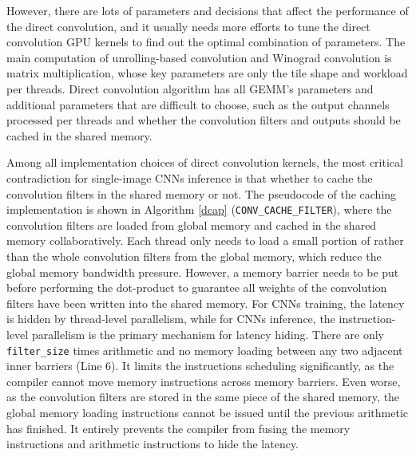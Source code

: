 \documentclass{article}
\begin{document}
However, there are lots of parameters and decisions that affect the performance of the direct convolution, and it usually needs more efforts to tune the direct convolution GPU kernels to find out the optimal combination of parameters. The main computation of unrolling-based convolution and Winograd convolution is matrix multiplication, whose key parameters are only the tile shape and workload per threads. Direct convolution algorithm has all GEMM's parameters and additional parameters that are difficult to choose, such as the output channels processed per threads and whether the convolution filters and outputs should be cached in the shared memory.

Among all implementation choices of direct convolution kernels, the most critical contradiction for single-image CNNs inference is that whether to cache the convolution filters in the shared memory or not. The pseudocode of the caching implementation is shown in Algorithm \ref{dcap} (\texttt{CONV\_CACHE\_FILTER}), where the convolution filters are loaded from global memory and cached in the shared memory collaboratively. Each thread only needs to load a small portion of rather than the whole convolution filters from the global memory, which reduce the global memory bandwidth pressure. However, a memory barrier needs to be put before performing the dot-product to guarantee all weights of the convolution filters have been written into the shared memory. For CNNs training, the latency is hidden by thread-level parallelism, while for CNNs inference, the instruction-level parallelism is the primary mechanism for latency hiding. There are only \texttt{filter\_size} times arithmetic and no memory loading between any two adjacent inner barriers (Line 6). It limits the instructions scheduling significantly, as the compiler cannot move memory instructions across memory barriers. Even worse, as the convolution filters are stored in the same piece of the shared memory, the global memory loading instructions cannot be issued until the previous arithmetic has finished. It entirely prevents the compiler from fusing the memory instructions and arithmetic instructions to hide the latency.
\end{document}

